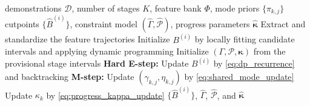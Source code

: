 \begin{algorithm}[t]
\caption{Stage-Wise Constraint Learning}
\label{alg:swcl}
\begin{algorithmic}[1]
\Require demonstrations $\mathcal{D}$, number of stages $K$, feature bank $\Phi$, mode priors $\{\pi_{k,j}\}$
\Ensure cutpoints $\{\hat B^{(i)}\}$, constraint model $(\hat\Gamma,\hat{\mathcal{P}})$, progress parameters $\hat{\boldsymbol{\kappa}}$
\State Extract and standardize the feature trajectories
    \State Initialize $B^{(i)}$ by locally fitting candidate intervals and applying dynamic programming
\EndFor
\State Initialize $(\Gamma,\mathcal{P},\boldsymbol{\kappa})$ from the provisional stage intervals
\Repeat
    \State \textbf{Hard E-step:}
        \State Update $B^{(i)}$ by \eqref{eq:dp_recurrence} and backtracking
    \EndFor
    \State \textbf{M-step:}
        \State Update $(\gamma_{k,j},\eta_{k,j})$ by \eqref{eq:shared_mode_update}
    \EndFor
        \State Update $\kappa_k$ by \eqref{eq:progress_kappa_update}
    \EndFor
{}
\State \Return $\{\hat B^{(i)}\}$, $\hat\Gamma$, $\hat{\mathcal{P}}$, and $\hat{\boldsymbol{\kappa}}$
\end{algorithmic}
\end{algorithm}
